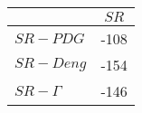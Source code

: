 \begin{tabular}{l|c}
\toprule
{} &  $SR$ \\
\midrule
\textbf{$SR-PDG$   } &  -108 \\
\textbf{$SR-Deng$  } &  -154 \\
\textbf{$SR-\Gamma$} &  -146 \\
\bottomrule
\end{tabular}
